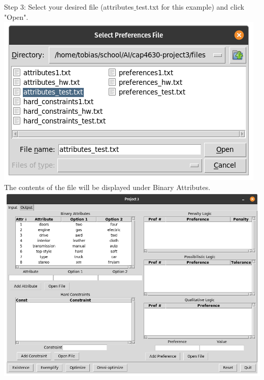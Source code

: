 \documentclass[11pt]{article}
\begin{document}
\begin{description}
Step 3: Select your desired file (attributes$\_$test.txt for this example) and click "Open".\\
\includegraphics[scale=0.3]{select_attributes}\\
The contents of the file will be displayed under Binary Attributes.\\
\includegraphics[scale=0.3]{attributes_imported}\\\\\\


\end{description}
\end{document}
